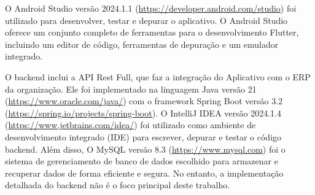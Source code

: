 O Android Studio versão 2024.1.1 (\url{https://developer.android.com/studio}) foi utilizado para desenvolver, testar e depurar o aplicativo. O Android Studio oferece um conjunto completo de ferramentas para o desenvolvimento Flutter, incluindo um editor de código, ferramentas de depuração e um emulador integrado.

%
%



O backend inclui a API Rest Full, que faz a integração do Aplicativo com o ERP da organização. Ele foi implementado na linguagem Java versão 21 (\url{https://www.oracle.com/java/}) com o framework Spring Boot versão 3.2 (\url{https://spring.io/projects/spring-boot}).
O IntelliJ IDEA versão 2024.1.4 (\url{https://www.jetbrains.com/idea/}) foi utilizado como ambiente de desenvolvimento integrado (IDE) para escrever, depurar e testar o código backend. 
Além disso, O MySQL versão 8.3 (\url{https://www.mysql.com}) foi o sistema de gerenciamento de banco de dados escolhido para armazenar e recuperar dados de forma eficiente e segura. 
No entanto, a implementação detalhada do backend não é o foco principal deste trabalho.

